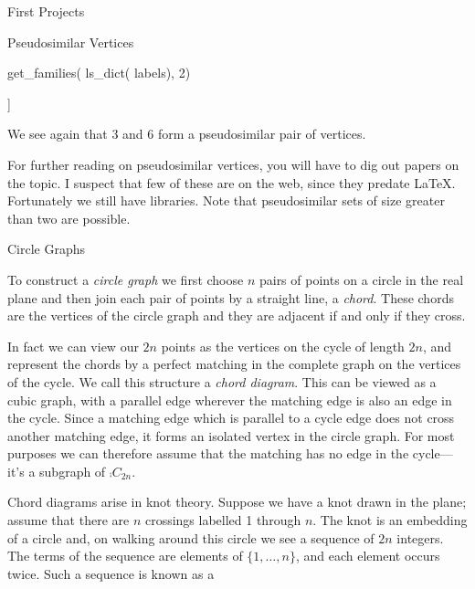 \begin{chap}{First Projects}
\begin{sect}{Pseudosimilar Vertices}
\begin{para}
\end{para}
%
\begin{sagecode}
\begin{sageinput}
get_families( ls_dict( labels), 2)
\end{sageinput}
\begin{sageoutput}
[[3, 6]]
\end{sageoutput}
\end{sagecode}
%
\begin{para}
We see again that 3 and 6 form a pseudosimilar pair of vertices.
\end{para}
%
\begin{para}
For further reading on pseudosimilar vertices, you will have to dig out papers
on the topic.  I suspect that few of these are on the web, since they
predate \LaTeX{}.  Fortunately we still have libraries.  Note that pseudosimilar
sets of size greater than two are possible.
\end{para}
%
\end{sect}
%
\begin{sect}{Circle Graphs}
%
\begin{para}
To construct a \textsl{circle graph} we first choose $n$ pairs of points on a 
circle in the real plane and then join each pair of points by a straight line,
a \textsl{chord}. These chords are the vertices of the circle graph and they
are adjacent if and only if they cross.
\end{para}
%
\begin{para}
In fact we can view our $2n$ points as the vertices on the cycle of length
$2n$, and represent the chords by a perfect matching in the complete graph
on the vertices of the cycle. We call this structure a \textsl{chord diagram}.
This can be viewed as a cubic graph, with a parallel edge wherever the matching
edge is also an edge in the cycle.
Since a matching edge which is parallel to a cycle edge does not cross
another matching edge, it forms an isolated vertex in the circle
graph. For most purposes we can therefore assume that the matching has
no edge in the cycle---it's a subgraph of $\comp{C_{2n}}$.
\end{para}
%
\begin{para}
Chord diagrams arise in knot theory. Suppose we have a knot drawn in the
plane; assume that there are $n$ crossings labelled 1 through $n$. The knot is 
an embedding of a circle and, on walking around this circle we see a sequence
of $2n$ integers. The terms of the sequence are elements of $\{1,\ldots,n\}$,
and each element occurs twice. Such a sequence is known as a 

\end{para}
\end{sect}
\end{chap}

